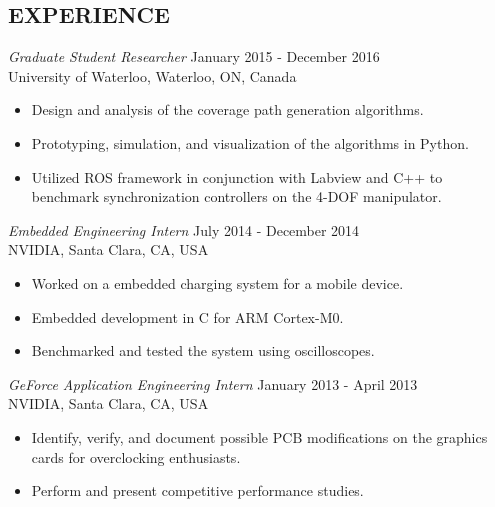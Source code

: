 \documentclass[margin, 10pt]{res} %
\begin{document}
\begin{resume}
 
\section{EXPERIENCE}

{\sl Graduate Student Researcher} \hfill January 2015 - December 2016 \\
University of Waterloo, Waterloo, ON, Canada
\begin{itemize}
\item Design and analysis of the coverage path generation algorithms. 
\item Prototyping, simulation, and visualization of the algorithms in Python.
\item Utilized ROS framework in conjunction with Labview and C++ to benchmark synchronization controllers on the 4-DOF manipulator.
\end{itemize} 

{\sl Embedded Engineering Intern} \hfill July 2014 - December 2014 \\
NVIDIA, Santa Clara, CA, USA
\begin{itemize}
\item Worked on a embedded charging system for a mobile device.
\item Embedded development in C for ARM Cortex-M0.
\item Benchmarked and tested the system using oscilloscopes.
\end{itemize} 


{\sl GeForce Application Engineering Intern} \hfill January 2013 - April 2013 \\
NVIDIA, Santa Clara, CA, USA
\begin{itemize} \itemsep -2pt %
\item Identify, verify, and document possible PCB modifications on the graphics cards for overclocking enthusiasts.
\item Perform and present competitive performance studies.
\end{itemize}
 

\end{resume}
\end{document}
